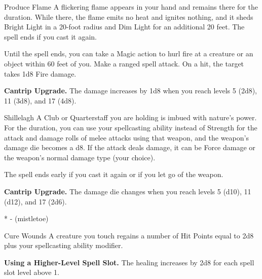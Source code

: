 

\pagestyle{empty}

\begin{Spell}[
    level=Cantrip,
    time=1 Bonus Action,
    range=Self,
    components={V, S},
    duration=10 Minutes,
    school=Conjuration,
    attack=Ranged,
    effect=Fire
  ]{Produce Flame}
A flickering flame appears in your hand and remains there for the duration. While there, the flame emits no heat and ignites nothing, and it sheds Bright Light in a 20-foot radius and Dim Light for an additional 20 feet. The spell ends if you cast it again.

Until the spell ends, you can take a Magic action to hurl fire at a creature or an object within 60 feet of you. Make a ranged spell attack. On a hit, the target takes 1d8 Fire damage.

\textbf{Cantrip Upgrade.} The damage increases by 1d8 when you reach levels 5 (2d8), 11 (3d8), and 17 (4d8).
\end{Spell}


\begin{Spell}[
    level=Cantrip,
    time=1 Bonus Action,
    range=Self,
    components={V, S, M*},
    duration=1 Minute,
    school=Transmutation,
    attack=Melee,
    effect=Bludgeoning
  ]{Shillelagh}
A Club or Quarterstaff you are holding is imbued with nature's power. For the duration, you can use your spellcasting ability instead of Strength for the attack and damage rolls of melee attacks using that weapon, and the weapon's damage die becomes a d8. If the attack deals damage, it can be Force damage or the weapon's normal damage type (your choice).

The spell ends early if you cast it again or if you let go of the weapon.

\textbf{Cantrip Upgrade.} The damage die changes when you reach levels 5 (d10), 11 (d12), and 17 (2d6).

* - (mistletoe)
\end{Spell}


\begin{Spell}[
    level=1st,
    time=1 Action,
    range=Touch,
    components={V, S},
    duration=Instantaneous,
    school=Abjuration,
    attack=None,
    effect=Healing
  ]{Cure Wounds}
A creature you touch regains a number of Hit Points equal to 2d8 plus your spellcasting ability modifier.

\textbf{Using a Higher-Level Spell Slot.} The healing increases by 2d8 for each spell slot level above 1.
\end{Spell}


